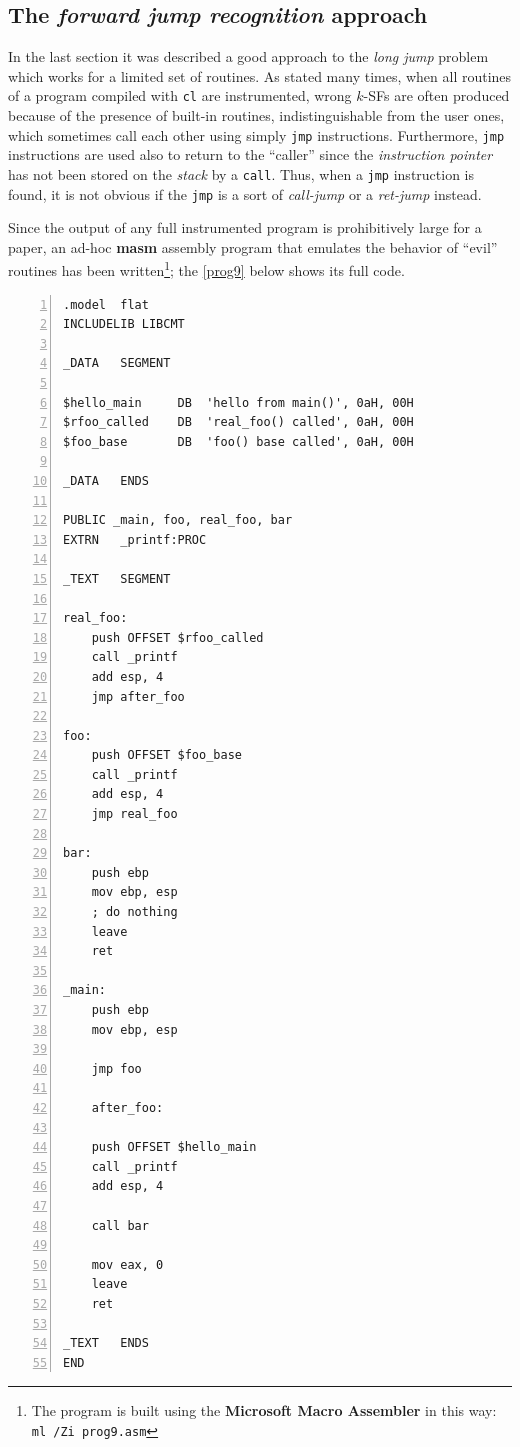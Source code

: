 \documentclass[a4paper,10pt]{report}
\begin{document}
\subsection{The \emph{forward jump recognition} approach}

In the last section it was described a good approach to the \emph{long jump} problem
which works for a limited set of routines. As stated many times, when
all routines of a program compiled with \verb|cl| are instrumented, wrong $k$-SFs
are often produced because of the presence of built-in routines, indistinguishable
from the user ones, which sometimes call each other using simply \verb|jmp| instructions.
Furthermore, \verb|jmp| instructions are used also to return to the ``caller'' 
since the \emph{instruction pointer} has not been stored on the \emph{stack}
by a \verb|call|. Thus, when a \verb|jmp| instruction is found, it is not obvious
if the \verb|jmp| is a sort of \emph{call-jump} or a \emph{ret-jump} instead.

Since the output of any full instrumented program is prohibitively large
for a paper, an ad-hoc \textbf{masm} assembly program that emulates the behavior 
of ``evil'' routines has been written\footnote{The program is built using
the \textbf{Microsoft Macro Assembler} in this way: \texttt{ml /Zi prog9.asm}}; 
the \cref{prog9} below shows its full code.

\begin{lstlisting}[language={[x86masm]Assembler}, 
	label=prog9, caption={prog9.asm, a tricky program}, frame=leftline, 
numbers=left, showstringspaces=false, deletekeywords={ah}]
.model	flat
INCLUDELIB LIBCMT

_DATA	SEGMENT

$hello_main		DB	'hello from main()', 0aH, 00H
$rfoo_called	DB	'real_foo() called', 0aH, 00H
$foo_base		DB	'foo() base called', 0aH, 00H

_DATA	ENDS

PUBLIC _main, foo, real_foo, bar
EXTRN	_printf:PROC

_TEXT	SEGMENT

real_foo:
	push OFFSET $rfoo_called
	call _printf
	add esp, 4
	jmp after_foo

foo:
	push OFFSET $foo_base
	call _printf
	add esp, 4
	jmp real_foo

bar:
	push ebp
	mov ebp, esp
	; do nothing
	leave
	ret

_main:	
	push ebp
	mov ebp, esp

	jmp foo
	
	after_foo:

	push OFFSET $hello_main
	call _printf
	add esp, 4

	call bar

	mov eax, 0
	leave
	ret

_TEXT	ENDS
END

\end{lstlisting}
\end{document}
